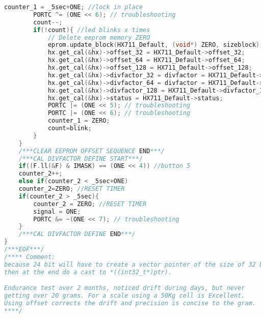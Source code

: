 \begin{lstlisting}[language=C, caption={main.c}, label=main-c, captionpos=b]
		counter_1 = _5sec+ONE; //lock in place
		PORTC ^= (ONE << 6); // troubleshooting
		count--;
		if(!count){ //led blinks x times
			// Delete eeprom memory ZERO
			eprom.update_block(HX711_Default, (void*) ZERO, sizeblock);
			hx.get_cal(&hx)->offset_32 = HX711_Default->offset_32;
			hx.get_cal(&hx)->offset_64 = HX711_Default->offset_64;
			hx.get_cal(&hx)->offset_128 = HX711_Default->offset_128;
			hx.get_cal(&hx)->divfactor_32 = divfactor = HX711_Default->divfactor_32;
			hx.get_cal(&hx)->divfactor_64 = divfactor = HX711_Default->divfactor_64;
			hx.get_cal(&hx)->divfactor_128 = HX711_Default->divfactor_128;
			hx.get_cal(&hx)->status = HX711_Default->status;
			PORTC |= (ONE << 5); // troubleshooting
			PORTC |= (ONE << 6); // troubleshooting
			counter_1 = ZERO;
			count=blink;
		}
	}
	/***CLEAR EEPROM OFFSET SEQUENCE END***/
	/***CAL DIVFACTOR DEFINE START***/
	if((F.ll(&F) & IMASK) == (ONE << 4)) //button 5
	counter_2++;
	else if(counter_2 < _5sec+ONE)
	counter_2=ZERO; //RESET TIMER
	if(counter_2 > _5sec){
		counter_2 = ZERO; //RESET TIMER
		signal = ONE;
		PORTC &= ~(ONE << 7); // troubleshooting
	}
	/***CAL DIVFACTOR DEFINE END***/
}
/***EOF***/
/**** Comment:
because 24 bit will have to create a vector pointer of the size of 32 bit,
then at the end do a cast to *((int32_t*)ptr).

Endurance test over 2 months, noticed drift during days, but never
getting over 20 grams. For a scale using a 50Kg cell is Excellent.
Using offset corrects the drift and precision is concise to the gram.
****/
\end{lstlisting}

